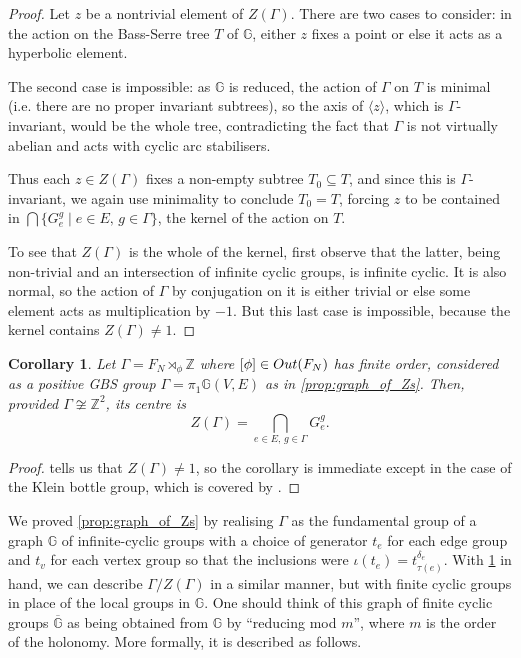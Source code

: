 \documentclass[11pt, a4 paper]{amsart}
\numberwithin{equation}{section}
\newtheorem{corollary}[theorem]{Corollary}
\theoremstyle{remark}
\theoremstyle{definition}
\def\Z{\mathbb Z}
\def\G{\Gamma}
\def\-{\overline}
\def\outN{{\rm{Out}}(F_N)}
\def\GG{\mathbb{G}}
\def\d{\delta}
\def\t{\tau}
\def\-{\overline}
\def\G{\Gamma}
\def\<{\langle}
\def\>{\rangle}
\begin{document}
\begin{proof} %
	Let $z$ be a nontrivial element of $Z(\G)$. 
	There are two cases to consider: 
	in the action on the Bass-Serre tree $T$ of $\GG$, 
	either $z$ fixes a point or else 
	it acts as a hyperbolic element. 
	
	The second case is impossible: 
	as $\GG$ is reduced, the action of $\G$ on $T$ is minimal 
	(i.e. there are no proper invariant subtrees), 
	so the axis of $\<z\>$, which is $\G$-invariant, 
	would be the whole tree, contradicting the fact that 
	$\G$ is	not virtually abelian 
	and acts with cyclic arc stabilisers. 
	
	Thus each $z\in Z(\G)$ 
	fixes a non-empty subtree $T_0\subseteq T$, 
	and since this is $\G$-invariant, 
	we again use minimality to conclude $T_0=T$, 
	forcing $z$ to be contained in 
	$\bigcap \{G_e^g\mid e\in E, \, g\in \G\}$, 
	the kernel of the action on $T$. 
	
	To see that $Z(\G)$ is the whole of the kernel, 
	first observe that the latter, being non-trivial and
	an intersection of infinite cyclic groups, 
	is infinite cyclic. 
	It is also normal, so the action of $\G$ by conjugation on it 
	is either trivial or else some element acts 
	as multiplication by $-1$. 
	But this last case is impossible, 
	because the kernel contains $Z(\G)\neq 1$. 
\end{proof}

\begin{corollary}
\label{c:center_upstairs}
	Let $\G=F_N\rtimes_\phi\Z$ 
	where $[\phi]\in\outN$ has finite order, 
	considered as a positive GBS group $\G=\pi_1\GG(V,E)$ as in \cref{prop:graph_of_Zs}.
	Then, provided $\G \not\cong \Z^2$, its centre is
	$$Z(\G) =\bigcap_{e \in E,\, g\in \G} G_e^g.$$
\end{corollary}

\begin{proof}
	 tells us that $Z(\G) \neq 1$, 
	so the corollary is immediate 
	except in the case of the Klein bottle group, 
	which is covered by . 
\end{proof}

We proved \cref{prop:graph_of_Zs} by realising $\G$ 
as the fundamental group of a graph $\GG$ of infinite-cyclic groups
with a choice of generator $t_e$ for each edge group 
and $t_v$ for each vertex group 
so that the inclusions were $\iota(t_e)= t_{\t(e)}^{\d_e}$. 
With \cref{c:center_upstairs} in hand, we can describe $\G/Z(\G)$
in a similar manner, but with finite cyclic groups 
in place of the local groups in $\GG$. 
One should think of this graph of finite cyclic groups $\-{\GG}$ 
as being obtained from $\GG$ by ``reducing mod $m$'', 
where $m$ is the order of the holonomy. 
More formally, it is described as follows. 
\end{document}
